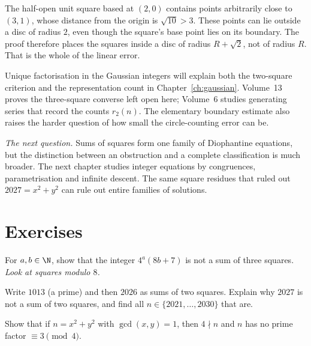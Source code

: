 \begin{examplex}
The half-open unit square based at $(2,0)$ contains points arbitrarily close to $(3,1)$, whose distance from the origin is $\sqrt{10}>3$. These points can lie outside a disc of radius $2$, even though the square's base point lies on its boundary. The proof therefore places the squares inside a disc of radius $R+\sqrt 2$, not of radius $R$. That is the whole of the linear error.
\end{examplex}

\begin{beauty}
Unique factorisation in the Gaussian integers will explain both the two-square criterion and the representation count in Chapter~\ref{ch:gaussian}. Volume~13 proves the three-square converse left open here; Volume~6 studies generating series that record the counts $r_2(n)$. The elementary boundary estimate also raises the harder question of how small the circle-counting error can be.
\end{beauty}

\medskip
\noindent\emph{The next question.} Sums of squares form one family of Diophantine equations, but the distinction between an obstruction and a complete classification is much broader. The next chapter studies integer equations by congruences, parametrisation and infinite descent. The same square residues that ruled out $2027=x^2+y^2$ can rule out entire families of solutions.

\section{Exercises}

\begin{exercise}[$\star$]\label{ex:three}
For $a,b\in\N$, show that the integer $4^a(8b+7)$ is not a sum of three squares. \emph{Look at squares modulo $8$.}
\end{exercise}

\begin{exercise}[$\star$]\label{ex:2026}
Write $1013$ (a prime) and then $2026$ as sums of two squares. Explain why $2027$ is not a sum of two squares, and find all $n\in\{2021,\dots,2030\}$ that are.
\end{exercise}

\begin{exercise}[$\star\star$]\label{ex:primitive2}
Show that if $n=x^2+y^2$ with $\gcd(x,y)=1$, then $4\nmid n$ and $n$ has no prime factor $\equiv3\pmod4$.
\end{exercise}

